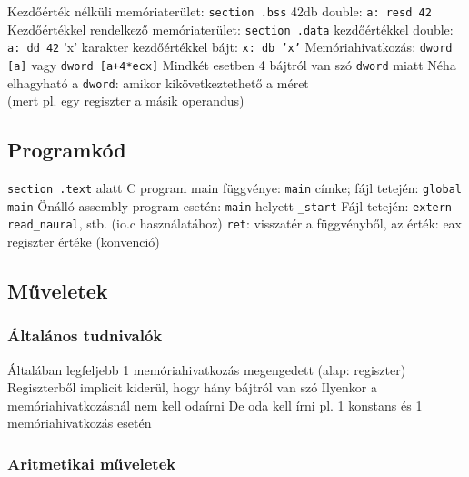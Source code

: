 \documentclass[12pt,a4paper]{article}
\begin{document}
\begin{outline}
	\1 Kezdőérték nélküli memóriaterület: \texttt{section .bss}
		\2 42db double: \texttt{a: resd 42}
	\1 Kezdőértékkel rendelkező memóriaterület: \texttt{section .data}
		 kezdőértékkel double: \texttt{a: dd 42}
		\2 'x' karakter kezdőértékkel bájt: \texttt{x: db 'x'}
	\1 Memóriahivatkozás: \texttt{dword [a]} vagy \texttt{dword [a+4*ecx]}
		\2 Mindkét esetben 4 bájtról van szó \texttt{dword} miatt
		\2 Néha elhagyható a \texttt{dword}: amikor kikövetkeztethető a méret\\
		(mert pl. egy regiszter a másik operandus)
\end{outline}

\subsection{Programkód}

\begin{outline}
	\1 \texttt{section .text} alatt
	\1 C program main függvénye: \texttt{main} címke; fájl tetején: \texttt{global main}
		\1 Önálló assembly program esetén: \texttt{main} helyett \texttt{\_start}
	\1 Fájl tetején: \texttt{extern read\_naural}, stb. (io.c használatához)
	\1 \texttt{ret}: visszatér a függvényből, az érték: eax regiszter értéke (konvenció)
\end{outline}

\pagebreak

\subsection{Műveletek}

\subsubsection{Általános tudnivalók}

\begin{outline}
	\1 Általában legfeljebb 1 memóriahivatkozás megengedett (alap: regiszter)
	\1 Regiszterből implicit kiderül, hogy hány bájtról van szó
		\2 Ilyenkor a memóriahivatkozásnál nem kell odaírni
		\2 De oda kell írni pl. 1 konstans és 1 memóriahivatkozás esetén
\end{outline}

\subsubsection{Aritmetikai műveletek}
\end{document}
